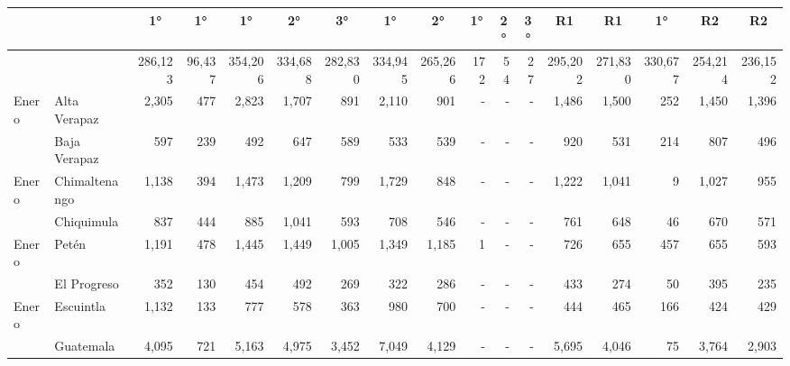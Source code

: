 \begin{landscape}
\begin{center}
\begin{longtable}{llrrrrrrrrrrrrrrr}
			\multicolumn{1}{c}{ }&\multicolumn{1}{c}{ }&	\multicolumn{1}{c}{1°}&		\multicolumn{1}{c}{1°}&		\multicolumn{1}{c}{1°}&		\multicolumn{1}{c}{2°}&		\multicolumn{1}{c}{3°}&		\multicolumn{1}{c}{1°}&		\multicolumn{1}{c}{2°}&		\multicolumn{1}{c}{1°}&		\multicolumn{1}{c}{2°}&		\multicolumn{1}{c}{3°}&		\multicolumn{1}{c}{R1}&		\multicolumn{1}{c}{R1}&		\multicolumn{1}{c}{1°}&	\multicolumn{1}{c}{R2}&		\multicolumn{1}{c}{R2}	\\\hline\endhead
\rowcolor{color1!40!white} \multicolumn{1}{l}{\Bold{	\footnotesize	 Total 	}}&		&	 286,123 	&	 96,437 	&	 354,206 	&	 334,688 	&	 282,830 	&	 334,945 	&	 265,266 	&	 172 	&	 54 	&	 27 	&	 295,202 	&	 271,830 	&	 330,677 	&	 254,214 	&	 236,152 	\\
\multicolumn{1}{l}{	\footnotesize	 Enero 	}&	 Alta Verapaz 	&	 2,305 	&	 477 	&	 2,823 	&	 1,707 	&	 891 	&	 2,110 	&	 901 	&	 -   	&	 -   	&	 -   	&	 1,486 	&	 1,500 	&	 252 	&	 1,450 	&	 1,396 	\\
\rowcolor{color1!5!white}\multicolumn{1}{l}{	\footnotesize	 Enero 	}&	 Baja Verapaz 	&	 597 	&	 239 	&	 492 	&	 647 	&	 589 	&	 533 	&	 539 	&	 -   	&	 -   	&	 -   	&	 920 	&	 531 	&	 214 	&	 807 	&	 496 	\\
\multicolumn{1}{l}{	\footnotesize	 Enero 	}&	 Chimaltenango 	&	 1,138 	&	 394 	&	 1,473 	&	 1,209 	&	 799 	&	 1,729 	&	 848 	&	 -   	&	 -   	&	 -   	&	 1,222 	&	 1,041 	&	 9 	&	 1,027 	&	 955 	\\
\rowcolor{color1!5!white}\multicolumn{1}{l}{	\footnotesize	 Enero 	}&	 Chiquimula 	&	 837 	&	 444 	&	 885 	&	 1,041 	&	 593 	&	 708 	&	 546 	&	 -   	&	 -   	&	 -   	&	 761 	&	 648 	&	 46 	&	 670 	&	 571 	\\
\multicolumn{1}{l}{	\footnotesize	 Enero 	}&	 Petén 	&	 1,191 	&	 478 	&	 1,445 	&	 1,449 	&	 1,005 	&	 1,349 	&	 1,185 	&	 1 	&	 -   	&	 -   	&	 726 	&	 655 	&	 457 	&	 655 	&	 593 	\\
\rowcolor{color1!5!white}\multicolumn{1}{l}{	\footnotesize	 Enero 	}&	 El Progreso 	&	 352 	&	 130 	&	 454 	&	 492 	&	 269 	&	 322 	&	 286 	&	 -   	&	 -   	&	 -   	&	 433 	&	 274 	&	 50 	&	 395 	&	 235 	\\
\multicolumn{1}{l}{	\footnotesize	 Enero 	}&	 Escuintla 	&	 1,132 	&	 133 	&	 777 	&	 578 	&	 363 	&	 980 	&	 700 	&	 -   	&	 -   	&	 -   	&	 444 	&	 465 	&	 166 	&	 424 	&	 429 	\\
\rowcolor{color1!5!white}\multicolumn{1}{l}{	\footnotesize	 Enero 	}&	 Guatemala 	&	 4,095 	&	 721 	&	 5,163 	&	 4,975 	&	 3,452 	&	 7,049 	&	 4,129 	&	 -   	&	 -   	&	 -   	&	 5,695 	&	 4,046 	&	 75 	&	 3,764 	&	 2,903 	\\

\end{longtable}
\end{center}
\end{landscape}
